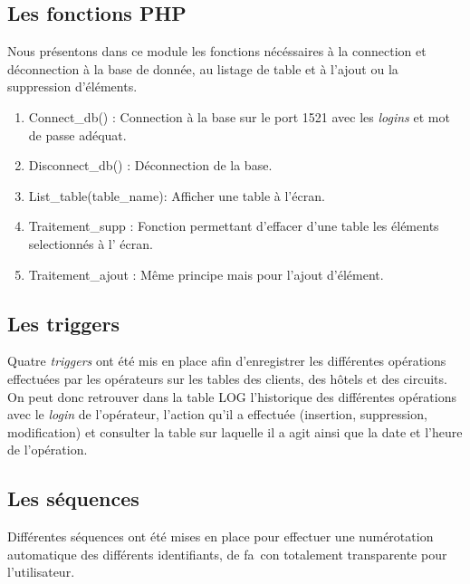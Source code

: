 \subsection{Les fonctions PHP}
Nous présentons dans ce module les fonctions n\'ec\'essaires \`a la connection et d\'econnection \`a la base de donn\'ee, au listage de table et \`a l'ajout ou la suppression d'\'el\'ements.

\begin{enumerate}
\item Connect\_db() : Connection \`a la base sur le port 1521 avec les \textit{logins} et mot de passe ad\'equat.
\item Disconnect\_db() : D\'econnection de la base.
\item List\_table(table\_name): Afficher une table \`a l'\'ecran.
\item Traitement\_supp : Fonction permettant d'effacer d'une table les \'el\'ements selectionn\'es \`a l' \'ecran.
\item Traitement\_ajout : M\^eme principe mais pour l'ajout d'\'el\'ement.
\end{enumerate}

\subsection{Les triggers}
Quatre \textit{triggers} ont \'et\'e mis en place afin d'enregistrer les diff\'erentes op\'erations effectu\'ees par les op\'erateurs sur les tables des clients, des h\^otels et des circuits.
On peut donc retrouver dans la table LOG l'historique des diff\'erentes op\'erations avec le \textit{login} de l'op\'erateur, l'action qu'il a effectu\'ee (insertion, suppression, modification) et consulter la table sur laquelle il a agit ainsi que la date et l'heure de l'op\'eration.

\subsection{Les s\'equences}
Diff\'erentes s\'equences ont \'et\'e mises en place pour effectuer une num\'erotation automatique des diff\'erents identifiants, de fa\ con totalement transparente pour l'utilisateur.

